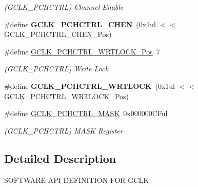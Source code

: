 \begin{DoxyCompactItemize}
\begin{DoxyCompactList}\small\item\em (G\+C\+L\+K\+\_\+\+P\+C\+H\+C\+T\+R\+L) Channel Enable \end{DoxyCompactList}\item 
\hypertarget{group___s_a_m_l21___g_c_l_k_ga824dd9efd6c3547b1874a152ac822c0a}{}\#define {\bfseries G\+C\+L\+K\+\_\+\+P\+C\+H\+C\+T\+R\+L\+\_\+\+C\+H\+E\+N}~(0x1ul $<$$<$ G\+C\+L\+K\+\_\+\+P\+C\+H\+C\+T\+R\+L\+\_\+\+C\+H\+E\+N\+\_\+\+Pos)\label{group___s_a_m_l21___g_c_l_k_ga824dd9efd6c3547b1874a152ac822c0a}

\item 
\hypertarget{group___s_a_m_l21___g_c_l_k_ga78453855f35c246cb0b5fc7b300d087b}{}\#define \hyperlink{group___s_a_m_l21___g_c_l_k_ga78453855f35c246cb0b5fc7b300d087b}{G\+C\+L\+K\+\_\+\+P\+C\+H\+C\+T\+R\+L\+\_\+\+W\+R\+T\+L\+O\+C\+K\+\_\+\+Pos}~7\label{group___s_a_m_l21___g_c_l_k_ga78453855f35c246cb0b5fc7b300d087b}

\begin{DoxyCompactList}\small\item\em (G\+C\+L\+K\+\_\+\+P\+C\+H\+C\+T\+R\+L) Write Lock \end{DoxyCompactList}\item 
\hypertarget{group___s_a_m_l21___g_c_l_k_gace5cd57c6e0683c212bb0fe6cb025ca1}{}\#define {\bfseries G\+C\+L\+K\+\_\+\+P\+C\+H\+C\+T\+R\+L\+\_\+\+W\+R\+T\+L\+O\+C\+K}~(0x1ul $<$$<$ G\+C\+L\+K\+\_\+\+P\+C\+H\+C\+T\+R\+L\+\_\+\+W\+R\+T\+L\+O\+C\+K\+\_\+\+Pos)\label{group___s_a_m_l21___g_c_l_k_gace5cd57c6e0683c212bb0fe6cb025ca1}

\item 
\hypertarget{group___s_a_m_l21___g_c_l_k_ga5cf0a3adfe1546fea5a9cf4018b2ec84}{}\#define \hyperlink{group___s_a_m_l21___g_c_l_k_ga5cf0a3adfe1546fea5a9cf4018b2ec84}{G\+C\+L\+K\+\_\+\+P\+C\+H\+C\+T\+R\+L\+\_\+\+M\+A\+S\+K}~0x000000\+C\+Ful\label{group___s_a_m_l21___g_c_l_k_ga5cf0a3adfe1546fea5a9cf4018b2ec84}

\begin{DoxyCompactList}\small\item\em (G\+C\+L\+K\+\_\+\+P\+C\+H\+C\+T\+R\+L) M\+A\+S\+K Register \end{DoxyCompactList}\end{DoxyCompactItemize}


\subsection{Detailed Description}
S\+O\+F\+T\+W\+A\+R\+E A\+P\+I D\+E\+F\+I\+N\+I\+T\+I\+O\+N F\+O\+R G\+C\+L\+K 
